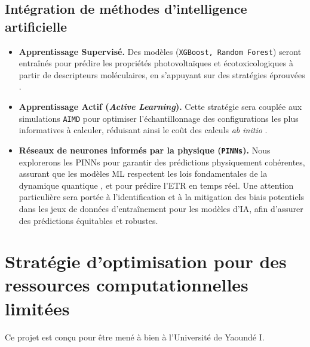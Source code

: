 \documentclass[12pt, a4paper]{article}
\begin{document}
\subsection{Intégration de méthodes d'intelligence artificielle}

\begin{itemize}
    \item \textbf{Apprentissage Supervisé.} Des modèles (\texttt{XGBoost, Random Forest}) seront entraînés pour prédire les propriétés photovoltaïques et écotoxicologiques à partir de descripteurs moléculaires, en s'appuyant sur des stratégies éprouvées \cite{liu2022, zhang2022_NFA}.

    \item \textbf{Apprentissage Actif (\textit{Active Learning}).} Cette stratégie sera couplée aux simulations \texttt{AIMD} pour optimiser l'échantillonnage des configurations les plus informatives à calculer, réduisant ainsi le coût des calculs \textit{ab initio} \cite{yati2025}.

    \item \textbf{Réseaux de neurones informés par la physique (\texttt{PINNs}).} Nous explorerons les PINNs pour garantir des prédictions physiquement cohérentes, assurant que les modèles ML respectent les lois fondamentales de la dynamique quantique \cite{Ullah2024}, et pour prédire l'ETR en temps réel. Une attention particulière sera portée à l'identification et à la mitigation des biais potentiels dans les jeux de données d'entraînement pour les modèles d'IA, afin d'assurer des prédictions équitables et robustes.
\end{itemize}

\section{Stratégie d'optimisation pour des ressources computationnelles limitées}

Ce projet est conçu pour être mené à bien à l'Université de Yaoundé I.
\end{document}
